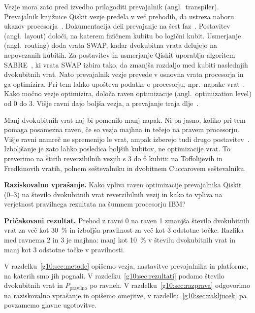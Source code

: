 Vezje mora zato pred izvedbo prilagoditi
prevajalnik (angl.\ transpiler).
Prevajalnik knjižnice Qiskit vezje predela v več prehodih,
da ustreza naboru ukazov procesorja~\cite{qiskit2024}.
Dokumentacija deli prevajanje
na šest faz~\cite{g10:qiskit_transpiler_stages}.
Postavitev (angl.\ layout) določi,
na katerem fizičnem kubitu bo logični kubit.
Usmerjanje (angl.\ routing) doda vrata SWAP,
kadar dvokubitna vrata delujejo na nepovezanih kubitih.
Za postavitev in usmerjanje Qiskit uporablja
algoritem SABRE~\cite{g10:li2019sabre}, ki 
vrata SWAP izbira tako, da zmanjša razdaljo
med kubiti naslednjih dvokubitnih vrat.
Nato prevajalnik vezje prevede v osnovna vrata procesorja
in ga optimizira.
Pri tem lahko upošteva podatke o procesorju,
npr.\ napake vrat~\cite{qiskit2024}.
Kako močno vezje optimizira, določa
raven optimizacije (angl.\ optimization level) od 0 do 3.
Višje ravni dajo boljša vezja,
a prevajanje traja dlje~\cite{g10:qiskit_optimization}.

Manj dvokubitnih vrat naj bi pomenilo manj napak.
Ni pa jasno, koliko pri tem pomaga posamezna raven,
če so vezja majhna in tečejo na pravem procesorju.
Višje ravni namreč ne spremenijo le vrat,
ampak izberejo tudi drugo postavitev~\cite{g10:qiskit_optimization}.
Izboljšanje je zato lahko posledica boljših kubitov,
ne optimizacije vrat.
To preverimo na štirih reverzibilnih vezjih
s 3 do 6 kubiti:
na Toffolijevih in Fredkinovih vratih, polnem seštevalniku
in dvobitnem Cuccarovem seštevalniku.

\begin{svgraybox}
\textbf{Raziskovalno vprašanje.} Kako vpliva raven 
optimizacije prevajalnika Qiskit (0--3) na 
število dvokubitnih vrat reverzibilnih vezij 
in kako to vpliva na verjetnost pravilnega rezultata 
na šumnem procesorju IBM?

\textbf{Pričakovani rezultat.} Prehod z ravni 0 na raven 1 zmanjša 
število dvokubitnih vrat za več kot 30~\% in izboljša 
pravilnost za več kot 3 odstotne točke. 
Razlika med ravnema 2 in 3 je majhna: manj 
kot 10~\% v številu dvokubitnih vrat in manj kot 3 
odstotne točke v pravilnosti.
\end{svgraybox}

V razdelku~\ref{g10:sec:metode} opišemo vezja,
nastavitve prevajalnika in platforme, na katerih smo jih pognali.
V razdelku~\ref{g10:sec:rezultati} podamo število dvokubitnih vrat
in $P_\text{pravilno}$ po ravneh.
V razdelku~\ref{g10:sec:razprava} odgovorimo na raziskovalno vprašanje
in opišemo omejitve,
v razdelku~\ref{g10:sec:zakljucek} pa povzamemo glavne ugotovitve.


